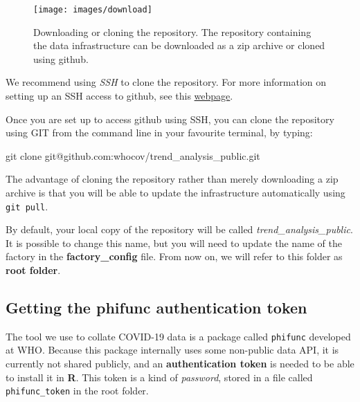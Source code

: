 \documentclass[]{book}
\newenvironment{Shaded}{\begin{snugshade}}{\end{snugshade}}
\newcommand{\FunctionTok}[1]{\textcolor[rgb]{0.00,0.00,0.00}{#1}}
\newcommand{\NormalTok}[1]{#1}
\begin{document}
\begin{figure}

{\centering \texttt{[image: images/download]} 

}

\caption{Downloading or cloning the repository. The repository containing the data infrastructure can be downloaded as a zip archive or cloned using github.}\label{fig:download}
\end{figure}

We recommend using \emph{SSH} to clone the repository. For more information on
setting up an SSH access to github, see this
\href{https://docs.github.com/en/github/authenticating-to-github/connecting-to-github-with-ssh}{webpage}.

Once you are set up to access github using SSH, you can clone the repository
using GIT from the command line in your favourite terminal, by typing:

\begin{Shaded}
\begin{Highlighting}[]
\FunctionTok{git}\NormalTok{ clone git@github.com:whocov/trend_analysis_public.git}
\end{Highlighting}
\end{Shaded}

The advantage of cloning the repository rather than merely downloading a zip
archive is that you will be able to update the infrastructure automatically
using \texttt{git\ pull}.

By default, your local copy of the repository will be called
\emph{trend\_analysis\_public}. It is possible to change this name, but you will need
to update the name of the factory in the \textbf{factory\_config} file. From now on,
we will refer to this folder as \textbf{root folder}.

\hypertarget{getting-the-phifunc-authentication-token}{%
\subsection{Getting the phifunc authentication token}\label{getting-the-phifunc-authentication-token}}

The tool we use to collate COVID-19 data is a package called \texttt{phifunc} developed
at WHO. Because this package internally uses some non-public data API, it is
currently not shared publicly, and an \textbf{authentication token} is needed to be
able to install it in \textbf{R}. This token is a kind of \emph{password}, stored in a
file called \texttt{phifunc\_token} in the root folder.
\end{document}
